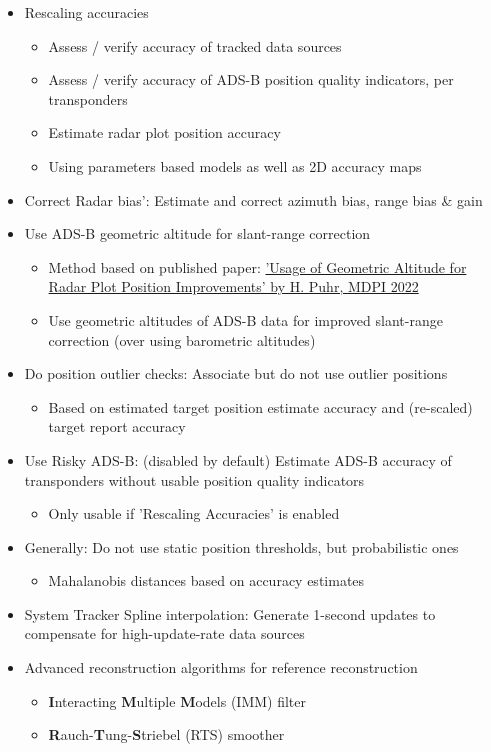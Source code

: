 \begin{itemize}
\begin{itemize}
\item Rescaling accuracies
\begin{itemize}
\item Assess / verify accuracy of tracked data sources
\item Assess / verify accuracy of ADS-B position quality indicators, per transponders
\item Estimate radar plot position accuracy
\item Using parameters based models as well as 2D accuracy maps
\end{itemize}
\item Correct Radar bias': Estimate and correct azimuth bias, range bias \& gain
\item Use ADS-B geometric altitude for slant-range correction
\begin{itemize}
\item Method based on published paper: \href{https://doi.org/10.3390/engproc2022028008}{'Usage of Geometric Altitude for Radar Plot Position Improvements' by H. Puhr, MDPI 2022}
\item Use geometric altitudes of ADS-B data for improved slant-range correction (over using barometric altitudes)
\end{itemize}
\item Do position outlier checks: Associate but do not use outlier positions
\begin{itemize}
\item Based on estimated target position estimate accuracy and (re-scaled) target report accuracy
\end{itemize}
\item Use Risky ADS-B: (disabled by default) Estimate ADS-B accuracy of transponders without usable position quality indicators
\begin{itemize}
\item Only usable if 'Rescaling Accuracies' is enabled
\end{itemize}
\item Generally: Do not use static position thresholds, but probabilistic ones
\begin{itemize}
\item Mahalanobis distances based on accuracy estimates
\end{itemize}
\item System Tracker Spline interpolation: Generate 1-second updates to compensate for high-update-rate data sources
\item Advanced reconstruction algorithms for reference reconstruction
\begin{itemize}
\item \textbf{I}nteracting \textbf{M}ultiple \textbf{M}odels (IMM) filter
\item \textbf{R}auch-\textbf{T}ung-\textbf{S}triebel (RTS) smoother
\end{itemize}
\end{itemize}



\end{itemize}
